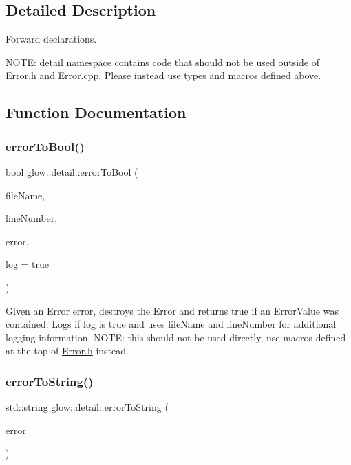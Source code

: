 \subsection{Detailed Description}
Forward declarations. 

N\+O\+TE\+: detail namespace contains code that should not be used outside of \hyperlink{_error_8h_source}{Error.\+h} and Error.\+cpp. Please instead use types and macros defined above. 

\subsection{Function Documentation}
\mbox{\label{namespaceglow_1_1detail_a01efc381cb4bbab786537b832d4c6f71}} 
\subsubsection{\texorpdfstring{error\+To\+Bool()}{errorToBool()}}
{\footnotesize\ttfamily bool glow\+::detail\+::error\+To\+Bool (\begin{DoxyParamCaption}\item[{const char $\ast$}]{file\+Name,  }\item[{size\+\_\+t}]{line\+Number,  }\item[{\hyperlink{classglow_1_1detail_1_1_glow_error}{Glow\+Error}}]{error,  }\item[{bool}]{log = {\ttfamily true} }\end{DoxyParamCaption})}

Given an Error {\ttfamily error}, destroys the Error and returns true if an Error\+Value was contained. Logs if {\ttfamily log} is true and uses {\ttfamily file\+Name} and {\ttfamily line\+Number} for additional logging information. N\+O\+TE\+: this should not be used directly, use macros defined at the top of \hyperlink{_error_8h_source}{Error.\+h} instead. \mbox{\label{namespaceglow_1_1detail_a31088d4ee87e842ac413f6029cf5bc7f}} 
\subsubsection{\texorpdfstring{error\+To\+String()}{errorToString()}}
{\footnotesize\ttfamily std\+::string glow\+::detail\+::error\+To\+String (\begin{DoxyParamCaption}\item[{\hyperlink{classglow_1_1detail_1_1_glow_error}{Glow\+Error}}]{error }\end{DoxyParamCaption})}

